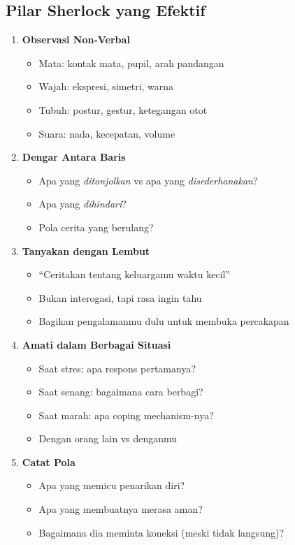 \subsection{Pilar Sherlock yang Efektif}

\begin{tipbox}
\begin{enumerate}
    \item \textbf{Observasi Non-Verbal}
    \begin{itemize}
        \item Mata: kontak mata, pupil, arah pandangan
        \item Wajah: ekspresi, simetri, warna
        \item Tubuh: postur, gestur, ketegangan otot
        \item Suara: nada, kecepatan, volume
    \end{itemize}
    
    \item \textbf{Dengar Antara Baris}
    \begin{itemize}
        \item Apa yang \textit{ditonjolkan} vs apa yang \textit{disederhanakan}?
        \item Apa yang \textit{dihindari}?
        \item Pola cerita yang berulang?
    \end{itemize}
    
    \item \textbf{Tanyakan dengan Lembut}
    \begin{itemize}
        \item ``Ceritakan tentang keluargamu waktu kecil''
        \item Bukan interogasi, tapi rasa ingin tahu
        \item Bagikan pengalamanmu dulu untuk membuka percakapan
    \end{itemize}
    
    \item \textbf{Amati dalam Berbagai Situasi}
    \begin{itemize}
        \item Saat stres: apa respons pertamanya?
        \item Saat senang: bagaimana cara berbagi?
        \item Saat marah: apa coping mechanism-nya?
        \item Dengan orang lain vs denganmu
    \end{itemize}
    
    \item \textbf{Catat Pola}
    \begin{itemize}
        \item Apa yang memicu penarikan diri?
        \item Apa yang membuatnya merasa aman?
        \item Bagaimana dia meminta koneksi (meski tidak langsung)?
    \end{itemize}
\end{enumerate}
\end{tipbox}

